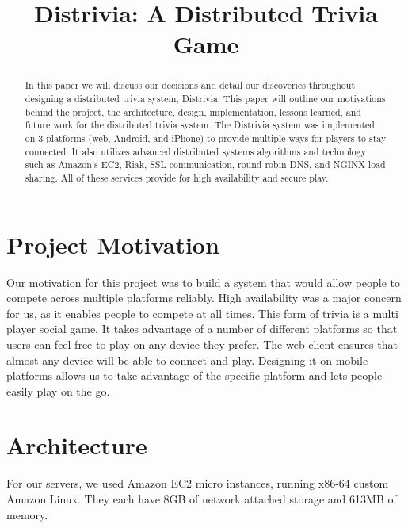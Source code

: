 \documentclass{dependencies/acm_proc_article-sp}
\begin{document}
\title{ Distrivia: A Distributed Trivia Game }
\maketitle

\begin{abstract}
In this paper we will discuss our decisions and detail our discoveries throughout designing a distributed trivia system, Distrivia.
This paper will outline our motivations behind the project, the architecture, design, implementation, lessons learned, and future work for the distributed trivia system.
The Distrivia system was implemented on 3 platforms (web, Android, and iPhone) to provide multiple ways for players to stay connected.
It also utilizes advanced distributed systems algorithms and technology such as Amazon's EC2, Riak, SSL communication, round robin DNS, and NGINX load sharing.
All of these services provide for high availability and secure play.
\end{abstract}

\section{Project Motivation}
Our motivation for this project was to build a system that would allow people to compete across multiple platforms reliably.
High availability was a major concern for us, as it enables people to compete at all times.
This form of trivia is a multi player social game.
It takes advantage of a number of different platforms so that users can feel free to play on any device they prefer.
The web client ensures that almost any device will be able to connect and play.
Designing it on mobile platforms allows us to take advantage of the specific platform and lets people easily play on the go.

\section{Architecture}
For our servers, we used Amazon EC2 micro instances,  running x86-64 custom Amazon Linux.
They each have 8GB of network attached storage and 613MB of memory.
\end{document}
